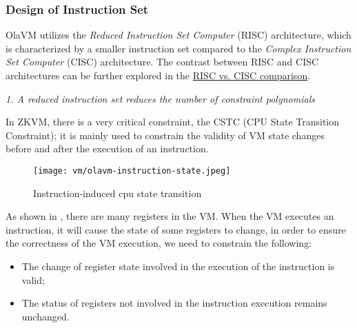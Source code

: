 \subsubsection{Design of Instruction Set} \label{sec:design-instruction-set}

OlaVM utilizes the \textit{Reduced Instruction Set Computer} (RISC) architecture, which is characterized by a smaller instruction set 
compared to the \textit{Complex Instruction Set Computer} (CISC) architecture.
The contrast between RISC and CISC architectures can be further explored in the \href{https://cs.stanford.edu/people/eroberts/courses/soco/projects/risc/risccisc/}{RISC vs. CISC comparison}.

\emph{1. A reduced instruction set reduces the number of constraint polynomials}

In ZKVM, there is a very critical constraint, the CSTC (CPU State Transition Constraint); it is mainly used to constrain the validity
of VM state changes before and after the execution of an instruction.

\begin{figure}[!ht]
    \centering
    \texttt{[image: vm/olavm-instruction-state.jpeg]}
    \caption{Instruction-induced cpu state transition}
    \label{fig:instruction-cpu-state-transition}
\end{figure}

As shown in , there are many registers in the VM. When the VM executes an instruction, it will
cause the state of some registers to change, in order to ensure the correctness of the VM execution, we need to constrain the following:
\begin{itemize}
    \item The change of register state involved in the execution of the instruction is valid;
    \item The status of registers not involved in the instruction execution remains unchanged.
\end{itemize}


